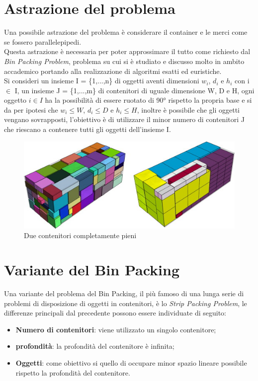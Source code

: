 \section{Astrazione del problema}
Una possibile astrazione del problema è considerare il container e le merci come se fossero parallelepipedi.\\
Questa astrazione è necessaria per poter approssimare il tutto come richiesto dal \textit{Bin Packing Problem}, problema su cui si è studiato e discusso molto in ambito accademico portando alla realizzazione di algoritmi esatti ed euristiche.\\
Si consideri un insieme I = \{1,...,n\} di oggetti aventi dimensioni $w_{i}$, $d_{i}$ e $h_{i}$ con i $\in$ I, un insieme J = \{1,...,m\} di contenitori di uguale dimensione W, D e H, ogni oggetto $i \in I$ ha la possibilità di essere ruotato di 90° rispetto la propria base e si da per ipotesi che $w_{i} \leq W$, $d_{i} \leq D$ e $h_{i} \leq H$, inoltre è possibile che gli oggetti vengano sovrapposti, l'obiettivo è di utilizzare il minor numero di contenitori J che riescano a contenere tutti gli oggetti dell'insieme I.
\begin{figure}[H]
	\begin{center} \includegraphics[scale=0.8]{figures/bin_packing}
		\caption[Bin packing figures]{Due contenitori completamente pieni}  
	\end{center}
\end{figure}

\section{Variante del Bin Packing}
Una variante del problema del Bin Packing, il più famoso di una lunga serie di problemi di disposizione di oggetti in contenitori, è lo \textit{Strip Packing Problem}, le differenze principali dal precedente possono essere individuate di seguito:
\begin{itemize}
	\item \textbf{Numero di contenitori}: viene utilizzato un singolo contenitore;
	\item \textbf{profondità}: la profondità del contenitore è infinita;
	\item \textbf{Oggetti}: come obiettivo si quello di occupare minor spazio lineare possibile rispetto la profondità del contenitore.
\end{itemize}
